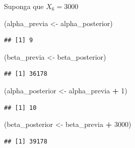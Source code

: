 \documentclass[
  12pt,
]{book}
\newenvironment{Shaded}{\begin{snugshade}}{\end{snugshade}}
\newcommand{\DecValTok}[1]{\textcolor[rgb]{0.00,0.00,0.81}{#1}}
\newcommand{\NormalTok}[1]{#1}
\newcommand{\OperatorTok}[1]{\textcolor[rgb]{0.81,0.36,0.00}{\textbf{#1}}}
\newcommand{\StringTok}[1]{\textcolor[rgb]{0.31,0.60,0.02}{#1}}
\begin{document}
Suponga que \(X_6 = 3000\)

\begin{Shaded}
\begin{Highlighting}[]
\NormalTok{(alpha\_previa \textless{}{-}}\StringTok{ }\NormalTok{alpha\_posterior)}
\end{Highlighting}
\end{Shaded}

\begin{verbatim}
## [1] 9
\end{verbatim}

\begin{Shaded}
\begin{Highlighting}[]
\NormalTok{(beta\_previa \textless{}{-}}\StringTok{ }\NormalTok{beta\_posterior)}
\end{Highlighting}
\end{Shaded}

\begin{verbatim}
## [1] 36178
\end{verbatim}

\begin{Shaded}
\begin{Highlighting}[]
\NormalTok{(alpha\_posterior \textless{}{-}}\StringTok{ }\NormalTok{alpha\_previa }\OperatorTok{+}\StringTok{ }\DecValTok{1}\NormalTok{)}
\end{Highlighting}
\end{Shaded}

\begin{verbatim}
## [1] 10
\end{verbatim}

\begin{Shaded}
\begin{Highlighting}[]
\NormalTok{(beta\_posterior \textless{}{-}}\StringTok{ }\NormalTok{beta\_previa }\OperatorTok{+}\StringTok{ }\DecValTok{3000}\NormalTok{)}
\end{Highlighting}
\end{Shaded}

\begin{verbatim}
## [1] 39178
\end{verbatim}
\end{document}
